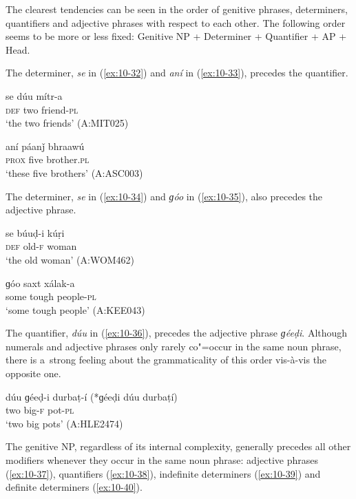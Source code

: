 The clearest tendencies can be seen in the order of genitive phrases, determiners, quantifiers and adjective phrases with respect to each other. The following order seems to be more or less fixed: Genitive NP + Determiner + Quantifier + AP + Head.


The determiner, \textit{se} in (\ref{ex:10-32}) and \textit{aní} in (\ref{ex:10-33}), precedes the quantifier.

\begin{exe}
\ex
\label{ex:10-32}
\gll se dúu mítr-a \\
\textsc{def} two friend-\textsc{pl} \\
\glt `the two friends' (A:MIT025)

\ex
\label{ex:10-33}
\gll aní páanǰ bhraawú \\
\textsc{prox} five brother.\textsc{pl}  \\
\glt `these five brothers' (A:ASC003)
\end{exe}

The determiner, \textit{se} in (\ref{ex:10-34}) and \textit{ɡóo} in (\ref{ex:10-35}), also precedes the adjective phrase.

\begin{exe}
\ex
\label{ex:10-34}
\gll se búuḍ-i kúṛi \\
\textsc{def} old-\textsc{f} woman \\
\glt `the old woman' (A:WOM462)

\ex
\label{ex:10-35}
\gll ɡóo saxt xálak-a \\
some tough people-\textsc{pl}  \\
\glt `some tough people' (A:KEE043)
\end{exe}


The quantifier, \textit{dúu} in (\ref{ex:10-36}), precedes the adjective phrase \textit{ɡéeḍi}. Although numerals and adjective phrases only rarely co"=occur in the same noun phrase, there is a~strong feeling about the grammaticality of this order vis-à-vis the opposite one.

\begin{exe}
\ex
\label{ex:10-36}
\gll dúu ɡéeḍ-i durbaṭ-í (*ɡéeḍi dúu durbaṭí) \\
two big-\textsc{f} pot-\textsc{pl} \\
\glt `two big pots' (A:HLE2474)
\end{exe}


The genitive NP, regardless of its internal complexity, generally precedes all other modifiers
whenever they occur in the same noun phrase: adjective phrases (\ref{ex:10-37}), quantifiers
(\ref{ex:10-38}), indefinite determiners (\ref{ex:10-39}) and definite determiners
(\ref{ex:10-40}).

